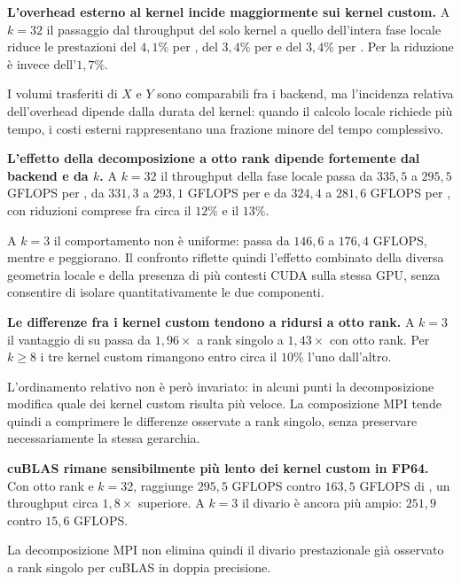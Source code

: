 \textbf{L'overhead esterno al kernel incide maggiormente sui kernel custom.}
A $k=32$ il passaggio dal throughput del solo kernel a quello dell'intera
fase locale riduce le prestazioni del $4{,}1\%$ per
, del $3{,}4\%$ per
 e del $3{,}4\%$ per
. Per  la riduzione è
invece dell'$1{,}7\%$.

I volumi trasferiti di $X$ e $Y$ sono comparabili fra i backend, ma
l'incidenza relativa dell'overhead dipende dalla durata del kernel:
quando il calcolo locale richiede più tempo, i costi esterni rappresentano
una frazione minore del tempo complessivo.

\textbf{L'effetto della decomposizione a otto rank dipende fortemente dal
backend e da $k$.}
A $k=32$ il throughput della fase locale passa da $335{,}5$ a
$295{,}5$ GFLOPS per , da $331{,}3$ a
$293{,}1$ GFLOPS per  e da $324{,}4$ a
$281{,}6$ GFLOPS per , con riduzioni
comprese fra circa il $12\%$ e il $13\%$.

A $k=3$ il comportamento non è uniforme: 
passa da $146{,}6$ a $176{,}4$ GFLOPS, mentre
 e  peggiorano.
Il confronto riflette quindi l'effetto combinato della diversa geometria
locale e della presenza di più contesti CUDA sulla stessa GPU, senza
consentire di isolare quantitativamente le due componenti.

\textbf{Le differenze fra i kernel custom tendono a ridursi a otto rank.}
A $k=3$ il vantaggio di  su
 passa da $1{,}96\times$ a rank singolo a
$1{,}43\times$ con otto rank. Per $k\ge8$ i tre kernel custom rimangono
entro circa il $10\%$ l'uno dall'altro.

L'ordinamento relativo non è però invariato: in alcuni punti la
decomposizione modifica quale dei kernel custom risulta più veloce.
La composizione MPI tende quindi a comprimere le differenze osservate a
rank singolo, senza preservare necessariamente la stessa gerarchia.

\textbf{cuBLAS rimane sensibilmente più lento dei kernel custom in FP64.}
Con otto rank e $k=32$,  raggiunge
$295{,}5$ GFLOPS contro $163{,}5$ GFLOPS di ,
un throughput circa $1{,}8\times$ superiore. A $k=3$ il divario è ancora
più ampio: $251{,}9$ contro $15{,}6$ GFLOPS.

La decomposizione MPI non elimina quindi il divario prestazionale già
osservato a rank singolo per cuBLAS in doppia precisione.

